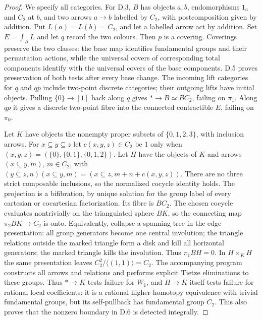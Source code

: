 \begin{proof}
We specify all categories. For D.3, $B$ has objects $a,b$, endomorphisms $1_a$ and $C_2$ at $b$, and two arrows $a\to b$ labelled by $C_2$, with postcomposition given by addition. Put $L(a)=L(b)=C_2$, and let a labelled arrow act by addition. Set $E=\int_BL$ and let $q$ record the two colours. Then $p$ is a covering. Coverings preserve the two classes: the base map identifies fundamental groups and their permutation actions, while the universal covers of corresponding total components identify with the universal covers of the base components. D.5 proves preservation of both tests after every base change. The incoming lift categories for $q$ and $qp$ include two-point discrete categories; their outgoing lifts have initial objects. Pulling $\{0\}\to[1]$ back along $q$ gives $*\to B\simeq BC_2$, failing on $\pi_1$. Along $qp$ it gives a discrete two-point fibre into the connected contractible $E$, failing on $\pi_0$.

Let $K$ have objects the nonempty proper subsets of $\{0,1,2,3\}$, with inclusion arrows. For $x\subseteq y\subseteq z$ let $c(x,y,z)\in C_2$ be $1$ only when $(x,y,z)=(\{0\},\{0,1\},\{0,1,2\})$. Let $H$ have the objects of $K$ and arrows $(x\subseteq y,m)$, $m\in C_2$, with
$(y\subseteq z,n)(x\subseteq y,m)=(x\subseteq z,m+n+c(x,y,z))$.
There are no three strict composable inclusions, so the normalized cocycle identity holds. The projection is a bifibration, by unique solution for the group label of every cartesian or cocartesian factorization. Its fibre is $BC_2$. The chosen cocycle evaluates nontrivially on the triangulated sphere $BK$, so the connecting map $\pi_2BK\to C_2$ is onto. Equivalently, collapse a spanning tree in the edge presentation: all group generators become one central involution; the triangle relations outside the marked triangle form a disk and kill all horizontal generators; the marked triangle kills the involution. Thus $\pi_1BH=0$. In $H\times_KH$ the same presentation leaves $C_2^2/\langle(1,1)\rangle=C_2$. The accompanying program constructs all arrows and relations and performs explicit Tietze eliminations to these groups. Thus $*\to K$ tests failure for $W_1$, and $H\to K$ itself tests failure for rational local coefficients: it is a rational higher-homotopy equivalence with trivial fundamental groups, but its self-pullback has fundamental group $C_2$. This also proves that the nonzero boundary in D.6 is detected integrally.


\end{proof}
